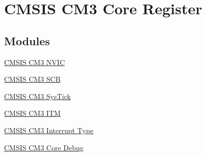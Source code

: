 \hypertarget{group___c_m_s_i_s___c_m3__core__register}{}\section{C\+M\+S\+IS C\+M3 Core Register}
\label{group___c_m_s_i_s___c_m3__core__register}
\subsection*{Modules}
\begin{DoxyCompactItemize}
\item 
\hyperlink{group___c_m_s_i_s___c_m3___n_v_i_c}{C\+M\+S\+I\+S C\+M3 N\+V\+IC}
\item 
\hyperlink{group___c_m_s_i_s___c_m3___s_c_b}{C\+M\+S\+I\+S C\+M3 S\+CB}
\item 
\hyperlink{group___c_m_s_i_s___c_m3___sys_tick}{C\+M\+S\+I\+S C\+M3 Sys\+Tick}
\item 
\hyperlink{group___c_m_s_i_s___c_m3___i_t_m}{C\+M\+S\+I\+S C\+M3 I\+TM}
\item 
\hyperlink{group___c_m_s_i_s___c_m3___interrupt_type}{C\+M\+S\+I\+S C\+M3 Interrupt Type}
\item 
\hyperlink{group___c_m_s_i_s___c_m3___core_debug}{C\+M\+S\+I\+S C\+M3 Core Debug}
\end{DoxyCompactItemize}
